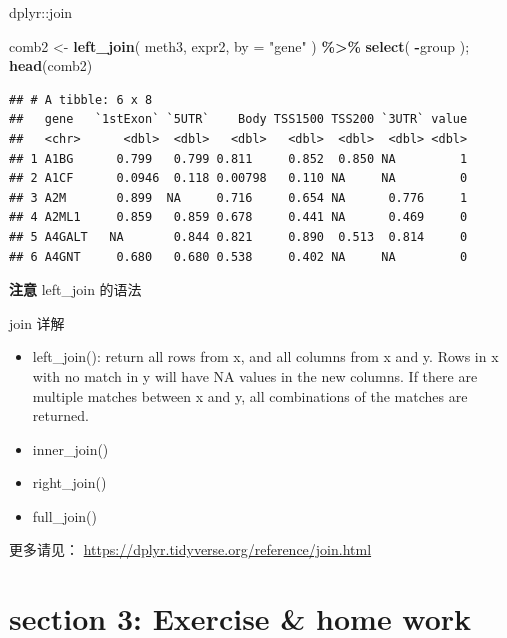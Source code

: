 \documentclass[ignorenonframetext,]{beamer}
\newenvironment{Shaded}{\begin{snugshade}}{\end{snugshade}}
\newcommand{\AttributeTok}[1]{\textcolor[rgb]{0.13,0.29,0.53}{#1}}
\newcommand{\FunctionTok}[1]{\textcolor[rgb]{0.13,0.29,0.53}{\textbf{#1}}}
\newcommand{\NormalTok}[1]{#1}
\newcommand{\OtherTok}[1]{\textcolor[rgb]{0.56,0.35,0.01}{#1}}
\newcommand{\SpecialCharTok}[1]{\textcolor[rgb]{0.81,0.36,0.00}{\textbf{#1}}}
\newcommand{\StringTok}[1]{\textcolor[rgb]{0.31,0.60,0.02}{#1}}
\newcommand\FontSmall{\fontsize{7}{8}\selectfont}
\newcommand\FontNormal{\fontsize{10}{10}\selectfont}
\begin{document}
\begin{frame}[fragile]{dplyr::join}
\protect\hypertarget{dplyrjoin}{}
\FontSmall

\begin{Shaded}
\begin{Highlighting}[]
\NormalTok{comb2 }\OtherTok{\textless{}{-}} \FunctionTok{left\_join}\NormalTok{( meth3, expr2, }\AttributeTok{by =} \StringTok{"gene"}\NormalTok{ ) }\SpecialCharTok{\%\textgreater{}\%} \FunctionTok{select}\NormalTok{( }\SpecialCharTok{{-}}\NormalTok{group );}
\FunctionTok{head}\NormalTok{(comb2)}
\end{Highlighting}
\end{Shaded}

\begin{verbatim}
## # A tibble: 6 x 8
##   gene   `1stExon` `5UTR`    Body TSS1500 TSS200 `3UTR` value
##   <chr>      <dbl>  <dbl>   <dbl>   <dbl>  <dbl>  <dbl> <dbl>
## 1 A1BG      0.799   0.799 0.811     0.852  0.850 NA         1
## 2 A1CF      0.0946  0.118 0.00798   0.110 NA     NA         0
## 3 A2M       0.899  NA     0.716     0.654 NA      0.776     1
## 4 A2ML1     0.859   0.859 0.678     0.441 NA      0.469     0
## 5 A4GALT   NA       0.844 0.821     0.890  0.513  0.814     0
## 6 A4GNT     0.680   0.680 0.538     0.402 NA     NA         0
\end{verbatim}

\FontNormal

\textbf{注意} left\_join 的语法
\end{frame}

\begin{frame}{join 详解}
\protect\hypertarget{join-ux8be6ux89e3}{}
\begin{itemize}
\item
  left\_join(): return all rows from x, and all columns from x and y.
  Rows in x with no match in y will have NA values in the new columns.
  If there are multiple matches between x and y, all combinations of the
  matches are returned.
\item
  inner\_join()
\item
  right\_join()
\item
  full\_join()
\end{itemize}

更多请见： \url{https://dplyr.tidyverse.org/reference/join.html}
\end{frame}

\hypertarget{section-3-exercise-home-work}{%
\section{section 3: Exercise \& home
work}\label{section-3-exercise-home-work}}
\end{document}
